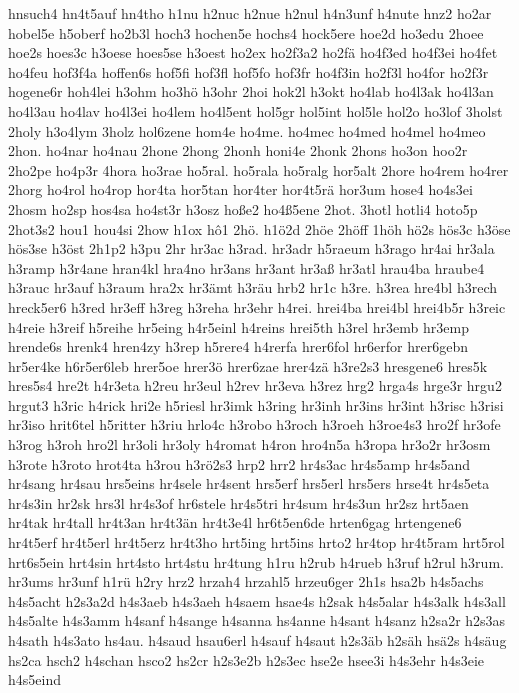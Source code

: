 {hnsuch4
hn4t5auf
hn4tho
h1nu
h2nuc
h2nue
h2nul
h4n3unf
h4nute
hnz2
ho2ar
hobel5e
h5oberf
ho2b3l
hoch3
hochen5e
hochs4
hock5ere
hoe2d
ho3edu
2hoee
hoe2s
hoes3c
h3oese
hoes5se
h3oest
ho2ex
ho2f3a2
ho2fä
ho4f3ed
ho4f3ei
ho4fet
ho4feu
hof3f4a
hoffen6s
hof5fi
hof3fl
hof5fo
hof3fr
ho4f3in
ho2f3l
ho4for
ho2f3r
hogene6r
hoh4lei
h3ohm
ho3hö
h3ohr
2hoi
hok2l
h3okt
ho4lab
ho4l3ak
ho4l3an
ho4l3au
ho4lav
ho4l3ei
ho4lem
ho4l5ent
hol5gr
hol5int
hol5le
hol2o
ho3lof
3holst
2holy
h3o4lym
3holz
hol6zene
hom4e
ho4me.
ho4mec
ho4med
ho4mel
ho4meo
2hon.
ho4nar
ho4nau
2hone
2hong
2honh
honi4e
2honk
2hons
ho3on
hoo2r
2ho2pe
ho4p3r
4hora
ho3rae
ho5ral.
ho5rala
ho5ralg
hor5alt
2hore
ho4rem
ho4rer
2horg
ho4rol
ho4rop
hor4ta
hor5tan
hor4ter
hor4t5rä
hor3um
hose4
ho4s3ei
2hosm
ho2sp
hos4sa
ho4st3r
h3osz
hoße2
ho4ß5ene
2hot.
3hotl
hotli4
hoto5p
2hot3s2
hou1
hou4si
2how
h1ox
hô1
2hö.
h1ö2d
2höe
2höff
1höh
hö2s
hös3c
h3öse
hös3se
h3öst
2h1p2
h3pu
2hr
hr3ac
h3rad.
hr3adr
h5raeum
h3rago
hr4ai
hr3ala
h3ramp
h3r4ane
hran4kl
hra4no
hr3ans
hr3ant
hr3aß
hr3atl
hrau4ba
hraube4
h3rauc
hr3auf
h3raum
hra2x
hr3ämt
h3räu
hrb2
hr1c
h3re.
h3rea
hre4bl
h3rech
hreck5er6
h3red
hr3eff
h3reg
h3reha
hr3ehr
h4rei.
hrei4ba
hrei4bl
hrei4b5r
h3reic
h4reie
h3reif
h5reihe
hr5eing
h4r5einl
h4reins
hrei5th
h3rel
hr3emb
hr3emp
hrende6s
hrenk4
hren4zy
h3rep
h5rere4
h4rerfa
hrer6fol
hr6erfor
hrer6gebn
hr5er4ke
h6r5er6leb
hrer5oe
hrer3ö
hrer6zae
hrer4zä
h3re2s3
hresgene6
hres5k
hres5s4
hre2t
h4r3eta
h2reu
hr3eul
h2rev
hr3eva
h3rez
hrg2
hrga4s
hrge3r
hrgu2
hrgut3
h3ric
h4rick
hri2e
h5riesl
hr3imk
h3ring
hr3inh
hr3ins
hr3int
h3risc
h3risi
hr3iso
hrit6tel
h5ritter
h3riu
hrlo4c
h3robo
h3roch
h3roeh
h3roe4s3
hro2f
hr3ofe
h3rog
h3roh
hro2l
hr3oli
hr3oly
h4romat
h4ron
hro4n5a
h3ropa
hr3o2r
hr3osm
h3rote
h3roto
hrot4ta
h3rou
h3rö2s3
hrp2
hrr2
hr4s3ac
hr4s5amp
hr4s5and
hr4sang
hr4sau
hrs5eins
hr4sele
hr4sent
hrs5erf
hrs5erl
hrs5ers
hrse4t
hr4s5eta
hr4s3in
hr2sk
hrs3l
hr4s3of
hr6stele
hr4s5tri
hr4sum
hr4s3un
hr2sz
hrt5aen
hr4tak
hr4tall
hr4t3an
hr4t3än
hr4t3e4l
hr6t5en6de
hrten6gag
hrtengene6
hr4t5erf
hr4t5erl
hr4t5erz
hr4t3ho
hrt5ing
hrt5ins
hrto2
hr4top
hr4t5ram
hrt5rol
hrt6s5ein
hrt4sin
hrt4sto
hrt4stu
hr4tung
h1ru
h2rub
h4rueb
h3ruf
h2rul
h3rum.
hr3ums
hr3unf
h1rü
h2ry
hrz2
hrzah4
hrzahl5
hrzeu6ger
2h1s
hsa2b
h4s5achs
h4s5acht
h2s3a2d
h4s3aeb
h4s3aeh
h4saem
hsae4s
h2sak
h4s5alar
h4s3alk
h4s3all
h4s5alte
h4s3amm
h4sanf
h4sange
h4sanna
hs4anne
h4sant
h4sanz
h2sa2r
h2s3as
h4sath
h4s3ato
hs4au.
h4saud
hsau6erl
h4sauf
h4saut
h2s3äb
h2säh
hsä2s
h4säug
hs2ca
hsch2
h4schan
hsco2
hs2cr
h2s3e2b
h2s3ec
hse2e
hsee3i
h4s3ehr
h4s3eie
h4s5eind
}
